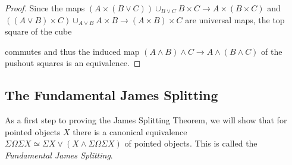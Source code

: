 \begin{lemma}
\begin{proof}
        Since the maps $\left(A\times(B\vee C)\right)\cup_{B\vee C} B\times C\to A\times (B\times C)$ and $\left((A\vee B)\times C\right)\cup_{A\vee B} A\times B\to (A\times B)\times C$ are universal maps, the top square of the cube
        \begin{center} %
        \end{center}
        commutes and thus the induced map $(A\wedge B)\wedge C\to A\wedge(B\wedge C)$ of the pushout squares is an equivalence.
    \end{proof}
\end{lemma}
\subsection*{The Fundamental James Splitting}
As a first step to proving the James Splitting Theorem, we will show that for pointed objects $X$ there is a canonical equivalence $\Sigma\Omega\Sigma X\simeq\Sigma X\vee\left(X\wedge\Sigma\Omega\Sigma X\right)$ of pointed objects.
This is called the \emph{Fundamental James Splitting}.

